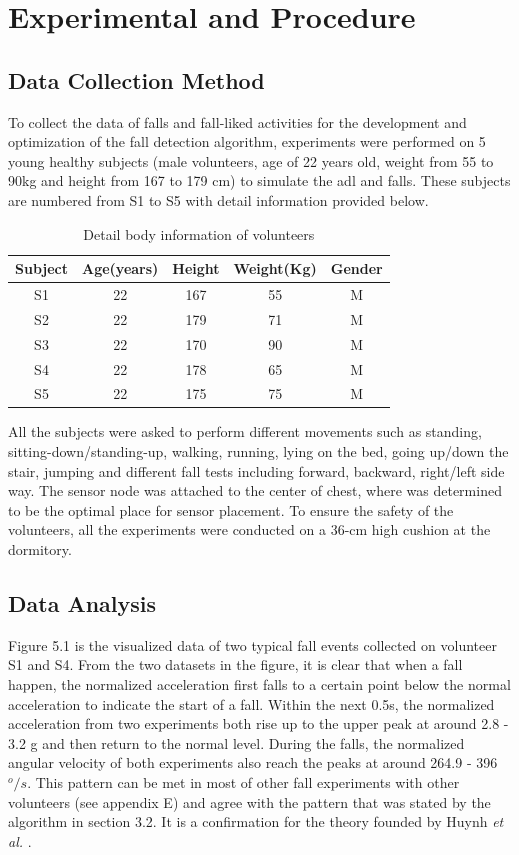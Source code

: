 \documentclass[letterpaper,12pt,titlepage,oneside,final]{book}
\begin{document}
\chapter{Experimental and Procedure}

\section{Data Collection Method}
To collect the data of falls and fall-liked activities for the development and optimization of the fall detection algorithm, experiments were performed on 5 young healthy subjects (male volunteers, age of 22 years old, weight from 55 to 90kg and height from 167 to 179 cm) to simulate the \gls{adl} and falls. These subjects are numbered from S1 to S5 with detail information provided below.
\begin{table}[h]
	\begin{center}
		\begin{tabular}{ |c|c|c|c|c| } 
			\hline
			Subject & Age(years) & Height & Weight(Kg) & Gender \\
			\hline
			S1 & 22 & 167 & 55 & M\\ %
			S2 & 22 & 179 & 71 & M\\ %
			S3 & 22 & 170 & 90 & M\\ %
			S4 & 22 & 178 & 65 & M\\ %
			S5 & 22 & 175 & 75 & M\\ %
			\hline
		\end{tabular}
		\caption{Detail body information of volunteers}
		\label{table:1}
	\end{center}
\end{table}\par
All the subjects were asked to perform different movements such as standing, sitting-down/standing-up, walking, running, lying on the bed, going up/down the stair, jumping and different fall tests including forward, backward, right/left side way. The sensor node was attached to the center of chest, where was determined to be the optimal place for sensor placement. To ensure the safety of the volunteers, all the experiments were conducted on a 36-cm high cushion at the dormitory.
\section{Data Analysis}
Figure 5.1 is the visualized data of two typical fall events collected on volunteer S1 and S4. From the two datasets in the figure, it is clear that when a fall happen, the normalized acceleration first falls to a certain point below the normal acceleration to indicate the start of a fall. Within the next 0.5s, the normalized acceleration from two experiments both rise up to the upper peak at around 2.8 - 3.2 g and then return to the normal level. During the falls, the normalized angular velocity of both experiments also reach the peaks at around 264.9 - 396$^{o}/s$. This pattern can be met in most of other fall experiments with other volunteers (see appendix E) and agree with the pattern that was stated by the algorithm in section 3.2. It is a confirmation for the theory founded by Huynh \textit{et al.} \cite{main_quoc}.\\
\end{document}
